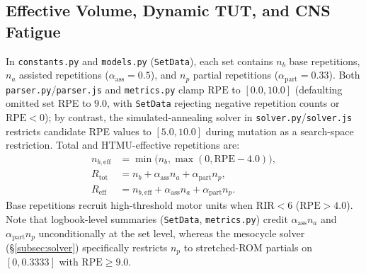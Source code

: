 \documentclass[10pt,twocolumn,letterpaper]{article}
\theoremstyle{plain}
\theoremstyle{definition}
\begin{document}
\subsection{Effective Volume, Dynamic TUT, and CNS Fatigue}
In \texttt{constants.py} and \texttt{models.py} (\texttt{SetData}), each set contains $n_b$ base repetitions, $n_a$ assisted repetitions ($\alpha_{\mathrm{ass}} = 0.5$), and $n_p$ partial repetitions ($\alpha_{\mathrm{part}} = 0.33$). Both \texttt{parser.py}/\texttt{parser.js} and \texttt{metrics.py} clamp $\mathrm{RPE}$ to $[0.0, 10.0]$ (defaulting omitted set RPE to $9.0$, with \texttt{SetData} rejecting negative repetition counts or $\mathrm{RPE} < 0$); by contrast, the simulated-annealing solver in \texttt{solver.py}/\texttt{solver.js} restricts candidate RPE values to $[5.0, 10.0]$ during mutation as a search-space restriction. Total and HTMU-effective repetitions are:
\begin{align}
  n_{b,\mathrm{eff}} &= \min\bigl(n_b, \max(0, \mathrm{RPE} - 4.0)\bigr), \\
  R_{\mathrm{tot}} &= n_b + \alpha_{\mathrm{ass}} n_a + \alpha_{\mathrm{part}} n_p, \\
  R_{\mathrm{eff}} &= n_{b,\mathrm{eff}} + \alpha_{\mathrm{ass}} n_a + \alpha_{\mathrm{part}} n_p.
\end{align}
Base repetitions recruit high-threshold motor units when $\mathrm{RIR} < 6$ ($\mathrm{RPE} > 4.0$). Note that logbook-level summaries (\texttt{SetData}, \texttt{metrics.py}) credit $\alpha_{\mathrm{ass}} n_a$ and $\alpha_{\mathrm{part}} n_p$ unconditionally at the set level, whereas the mesocycle solver (\S\ref{subsec:solver}) specifically restricts $n_p$ to stretched-ROM partials on $[0, 0.3333]$ with $\mathrm{RPE} \ge 9.0$.
\end{document}
